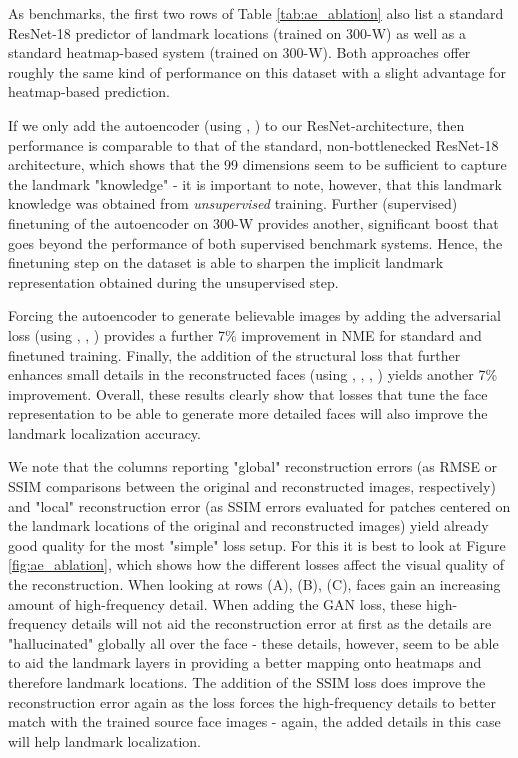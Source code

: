 \documentclass[10pt,twocolumn,letterpaper]{article}
\begin{document}
As benchmarks, the first two rows of Table \ref{tab:ae_ablation} also list a standard ResNet-18 predictor of landmark locations (trained on 300-W) as well as a standard heatmap-based system (trained on 300-W). Both approaches offer roughly the same kind of performance on this dataset with a slight advantage for heatmap-based prediction. 

If we only add the autoencoder (using  ,  ) to our ResNet-architecture, then performance is comparable to that of the standard, non-bottlenecked ResNet-18 architecture, which shows that the 99 dimensions seem to be sufficient to capture the landmark "knowledge" - it is important to note, however, that this landmark knowledge was obtained from {\em unsupervised} training. Further (supervised) finetuning of the autoencoder on 300-W provides another, significant boost that goes beyond the performance of both supervised benchmark systems. Hence, the finetuning step on the dataset is able to sharpen the implicit landmark representation obtained during the unsupervised step. 

Forcing the autoencoder to generate believable images by adding the adversarial loss (using  ,  , ) provides a further 7\% improvement in NME for standard and finetuned training. Finally, the addition of the structural loss that further enhances small details in the reconstructed faces (using  ,  , , )  yields another 7\% improvement. Overall, these results clearly show that losses that tune the face representation to be able to generate more detailed faces will also improve the landmark localization accuracy.

We note that the columns reporting "global" reconstruction errors (as RMSE or SSIM comparisons between the original and reconstructed images, respectively) and "local" reconstruction error (as SSIM errors evaluated for patches centered on the landmark locations of the original and reconstructed images) yield already good quality for the most "simple" loss setup. For this it is best to look at Figure \ref{fig:ae_ablation}, which shows how the different losses affect the visual quality of the reconstruction. When looking at rows (A), (B), (C), faces gain an increasing amount of high-frequency detail. When adding the GAN loss, these high-frequency details will not aid the reconstruction error at first as the details are "hallucinated" globally all over the face - these details, however, seem to be able to aid the landmark layers in providing a better mapping onto heatmaps and therefore landmark locations. The addition of the SSIM loss does improve the reconstruction error again as the loss forces the high-frequency details to better match with the trained source face images - again, the added details in this case will help landmark localization.
\end{document}
